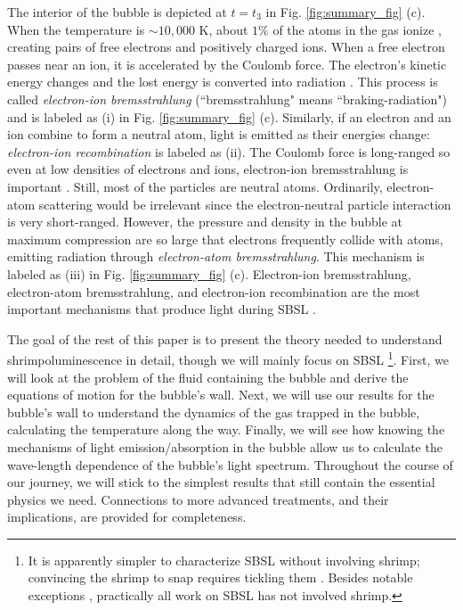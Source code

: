 \documentclass[11pt,prb,aps,nofootinbib,superscriptaddress,floatfix]{revtex4-2}
\begin{document}
The interior of the bubble is depicted at $t=t_3$ in Fig. \ref{fig:summary_fig} (c). When the temperature is $\sim 10,000$ K, about $1 \%$ of the atoms in the gas ionize \cite{hilgenfeldt1999simple,yasui1999mechanism}, creating pairs of free electrons and positively charged ions. When a free electron passes near an ion, it is accelerated by the Coulomb force. The electron's kinetic energy changes and the lost energy is converted into radiation \cite{zel2002physics,griffiths2005introduction,jackson1999classical}. This process is called \emph{electron-ion bremsstrahlung} (``bremsstrahlung" means ``braking-radiation") and is labeled as (i) in Fig. \ref{fig:summary_fig} (c). Similarly, if an electron and an ion combine to form a neutral atom, light is emitted as their energies change: \emph{electron-ion recombination} is labeled as (ii). 
The Coulomb force is long-ranged so even at low densities of electrons and ions, electron-ion bremsstrahlung is important \cite{zel2002physics}. Still, most of the particles are neutral atoms. Ordinarily, electron-atom scattering would be irrelevant since the electron-neutral particle interaction is very short-ranged. However, the pressure and density in the bubble at maximum compression are so large that electrons frequently collide with atoms, emitting radiation through \emph{electron-atom bremsstrahlung}. This mechanism is labeled as (iii) in Fig. \ref{fig:summary_fig} (c). Electron-ion bremsstrahlung, electron-atom bremsstrahlung, and electron-ion recombination are the most important mechanisms that produce light during SBSL \cite{hilgenfeldt1999simple,hilgenfeldt1999sonoluminescence,an2006mechanism,an2008spectral,an2009diagnosing,suslick2008inside}.

The goal of the rest of this paper is to present the theory needed to understand shrimpoluminescence in detail, though we will mainly focus on SBSL \footnote{It is apparently simpler to characterize SBSL without involving shrimp; convincing the shrimp to snap requires tickling them \cite{lohse2001snapping,versluis2000snapping,lohse2018bubble}. Besides notable exceptions \cite{tang2019bioinspired}, practically all work on SBSL has not involved shrimp.}. First, we will look at the problem of the fluid containing the bubble and derive the equations of motion for the bubble's wall. Next, we will use our results for the bubble's wall to understand the dynamics of the gas trapped in the bubble, calculating the temperature along the way. Finally, we will see how knowing the mechanisms of light emission/absorption in the bubble allow us to calculate the wave-length dependence of the bubble's light spectrum. Throughout the course of our journey, we will stick to the simplest results that still contain the essential physics we need. Connections to more advanced treatments, and their implications, are provided for completeness.
\end{document}
